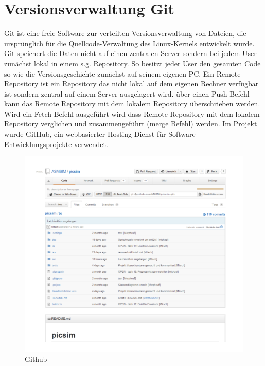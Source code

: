 \newpage
\section{Versionsverwaltung Git}
Git ist eine freie Software zur verteilten Versionsverwaltung von Dateien, die urspr\"unglich f\"ur die Quellcode-Verwaltung des Linux-Kernels entwickelt wurde. Git speichert die Daten nicht auf einen zentralen Server sondern bei jedem User zun\"achst lokal in einem s.g. Repository. So besitzt jeder User den gesamten Code so wie die Versionsgeschichte zun\"achst auf seinem eigenen PC. Ein Remote Repository ist ein Repository das nicht lokal auf dem eigenen Rechner verf\"ugbar ist sondern zentral auf einem Server ausgelagert wird. \"uber einen Push Befehl kann das Remote Repository mit dem lokalem Repository \"uberschrieben werden. Wird ein Fetch Befehl ausgef\"uhrt wird dass Remote Repository mit dem lokalem Repository verglichen und zusammengef\"uhrt (merge Befehl) werden. Im Projekt wurde GitHub, ein webbasierter Hosting-Dienst f\"ur Software-Entwicklungsprojekte verwendet.


\begin{figure}[h]

\includegraphics[scale=0.55]{Bilder/Github.pdf}
\caption{Github}
\end{figure}
